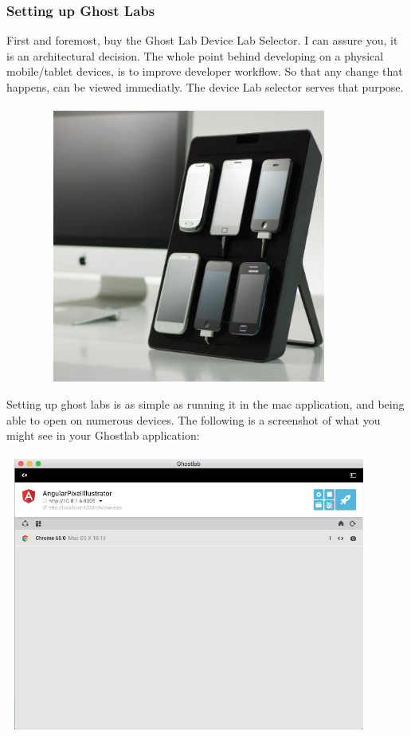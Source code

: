 \subsubsection{ Setting up Ghost Labs }
First and foremost, buy the Ghost Lab Device Lab Selector. I can assure you, it
is an architectural decision. The whole point behind developing on a physical
mobile/tablet devices, is to improve developer workflow. So that any change that
happens, can be viewed immediatly. The device Lab selector serves that purpose.
\\
\\
\includegraphics[width=12.1cm, height=9cm]{pwa/pwa-toolset-physical-devices/device-lab-stand}

Setting up ghost labs is as simple as running it in the mac application, and
being able to open on numerous devices. The following is a screenshot of what
you might see in your Ghostlab application:
\\
\\
\includegraphics[width=12.1cm, height=9cm]{pwa/pwa-toolset-physical-devices/ghostlabs-screenshot}


